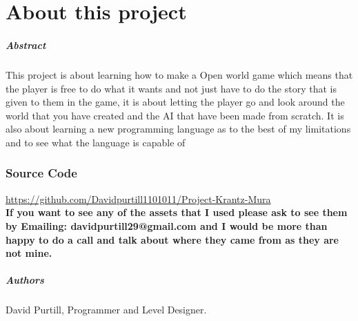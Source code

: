 
\chapter{About this project}
\paragraph{Abstract}
This project is about learning how to make a Open world game which means that the player is free to do what it wants and not just have to do the story that is given to them in the game, it is about letting the player go and look around the world that you have created and the AI that have been made from scratch. It is also about learning a new programming language as to the best of my limitations and to see what the language is capable of
\subsection{Source Code}
\url{https://github.com/Davidpurtill1101011/Project-Krantz-Mura}\\
\textbf{If you want to see any of the assets that I used please ask to see them by Emailing: davidpurtill29@gmail.com and I would be more than happy to do a call and talk about where they came from as they are not mine.}
\paragraph{Authors}
David Purtill, Programmer and Level Designer. 

